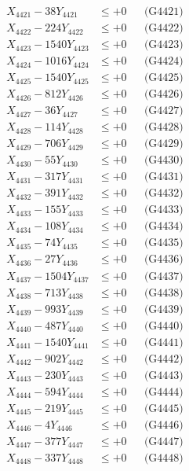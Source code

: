 \documentclass[a4paper,10pt]{article}
\begin{document}
{\begin{align}
\allowbreak
X_{4421} - 38Y_{4421} &\leq +0 && \text{(G4421)} \\
X_{4422} - 224Y_{4422} &\leq +0 && \text{(G4422)} \\
X_{4423} - 1540Y_{4423} &\leq +0 && \text{(G4423)} \\
X_{4424} - 1016Y_{4424} &\leq +0 && \text{(G4424)} \\
X_{4425} - 1540Y_{4425} &\leq +0 && \text{(G4425)} \\
X_{4426} - 812Y_{4426} &\leq +0 && \text{(G4426)} \\
X_{4427} - 36Y_{4427} &\leq +0 && \text{(G4427)} \\
X_{4428} - 114Y_{4428} &\leq +0 && \text{(G4428)} \\
X_{4429} - 706Y_{4429} &\leq +0 && \text{(G4429)} \\
X_{4430} - 55Y_{4430} &\leq +0 && \text{(G4430)} \\
\allowbreak
X_{4431} - 317Y_{4431} &\leq +0 && \text{(G4431)} \\
X_{4432} - 391Y_{4432} &\leq +0 && \text{(G4432)} \\
X_{4433} - 155Y_{4433} &\leq +0 && \text{(G4433)} \\
X_{4434} - 108Y_{4434} &\leq +0 && \text{(G4434)} \\
X_{4435} - 74Y_{4435} &\leq +0 && \text{(G4435)} \\
X_{4436} - 27Y_{4436} &\leq +0 && \text{(G4436)} \\
X_{4437} - 1504Y_{4437} &\leq +0 && \text{(G4437)} \\
X_{4438} - 713Y_{4438} &\leq +0 && \text{(G4438)} \\
X_{4439} - 993Y_{4439} &\leq +0 && \text{(G4439)} \\
X_{4440} - 487Y_{4440} &\leq +0 && \text{(G4440)} \\
\allowbreak
X_{4441} - 1540Y_{4441} &\leq +0 && \text{(G4441)} \\
X_{4442} - 902Y_{4442} &\leq +0 && \text{(G4442)} \\
X_{4443} - 230Y_{4443} &\leq +0 && \text{(G4443)} \\
X_{4444} - 594Y_{4444} &\leq +0 && \text{(G4444)} \\
X_{4445} - 219Y_{4445} &\leq +0 && \text{(G4445)} \\
X_{4446} - 4Y_{4446} &\leq +0 && \text{(G4446)} \\
X_{4447} - 377Y_{4447} &\leq +0 && \text{(G4447)} \\
X_{4448} - 337Y_{4448} &\leq +0 && \text{(G4448)} \\

\end{align}}
\end{document}

